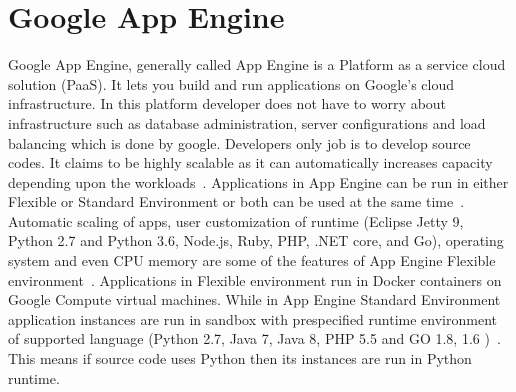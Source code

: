 \section{Google App Engine}

Google App Engine, generally called App Engine is a Platform as a service cloud 
solution (PaaS). It lets you build and run applications on Google’s cloud 
infrastructure. In this platform developer does  not have to worry about 
infrastructure such as database administration, server configurations and 
load balancing which is done by google. Developers only job is to develop 
source codes.  It claims to be highly scalable as it can automatically 
increases capacity depending upon the workloads~\cite{hid-sp18-415-www-scalability}. 
Applications in App Engine can be run in either Flexible or Standard Environment or 
both can be used at the same time~\cite{hid-sp18-415-www-cloud-google}. 
Automatic scaling of apps, user customization of runtime (Eclipse Jetty 9, 
Python 2.7 and Python 3.6, Node.js, Ruby, PHP, .NET core, and Go), operating 
system and even CPU memory  are some of the features of App Engine Flexible 
environment~\cite{hid-sp18-415-www-cloud-google}. Applications in Flexible 
environment run in Docker containers on Google Compute virtual machines. While 
in App Engine Standard Environment application instances are run in sandbox with 
prespecified runtime environment of supported language (Python 2.7, Java 7, 
Java 8, PHP 5.5 and GO 1.8,  1.6 )~\cite{hid-sp18-415-app-engine}. 
This means if source code uses Python then its instances are run in Python runtime. 
